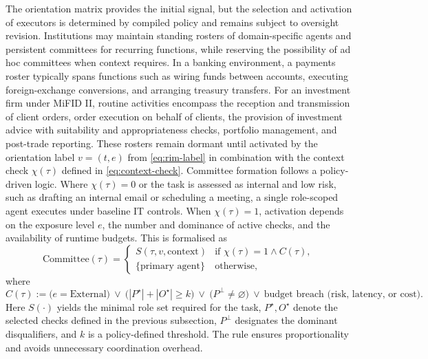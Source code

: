 \documentclass[oneside,10pt]{swissi}
\begin{document}
The orientation matrix provides the initial signal, but the selection and activation of executors is determined by compiled policy and remains subject to oversight revision. Institutions may maintain standing rosters of domain-specific agents and persistent committees for recurring functions, while reserving the possibility of ad hoc committees when context requires. In a banking environment, a payments roster typically spans functions such as wiring funds between accounts, executing foreign-exchange conversions, and arranging treasury transfers. For an investment firm under MiFID II, routine activities encompass the reception and transmission of client orders, order execution on behalf of clients, the provision of investment advice with suitability and appropriateness checks, portfolio management, and post-trade reporting. These rosters remain dormant until activated by the orientation label \(v=(t,e)\) from \eqref{eq:rim-label} in combination with the context check \(\chi(\tau)\) defined in \eqref{eq:context-check}. Committee formation follows a policy-driven logic. Where \(\chi(\tau)=0\) or the task is assessed as internal and low risk, such as drafting an internal email or scheduling a meeting, a single role-scoped agent executes under baseline IT controls. When \(\chi(\tau)=1\), activation depends on the exposure level \(e\), the number and dominance of active checks, and the availability of runtime budgets. This is formalised as
\begin{equation}
\mathrm{Committee}(\tau)=
\begin{cases}
S(\tau,v,\text{context}) & \text{if } \chi(\tau)=1 \land C(\tau),\\[4pt]
\{\text{primary agent}\} & \text{otherwise,}
\end{cases}
\label{eq:committee}
\end{equation}
where
\begin{equation}
C(\tau):=\big(e=\text{External}\big)\ \lor\ \big(|P^{\star}|+|O^{\star}|\ge k\big)\ \lor\ \big(P^{\perp}\neq\varnothing\big)\ \lor\ \text{budget breach (risk, latency, or cost)}.
\end{equation}
Here \(S(\cdot)\) yields the minimal role set required for the task, \(P^{\star},O^{\star}\) denote the selected checks defined in the previous subsection, \(P^{\perp}\) designates the dominant disqualifiers, and \(k\) is a policy-defined threshold. The rule ensures proportionality and avoids unnecessary coordination overhead.
\end{document}
